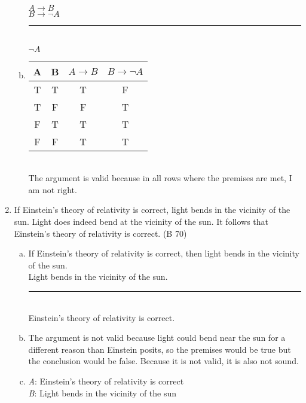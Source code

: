 \documentclass{article}
\begin{document}
\begin{enumerate}
\begin{enumerate}[(a)]
                        $A \to B$\\
                        $B \to \neg A$\\
                        \rule{5em}{.5pt}\\
                        $\neg A$
                  \item
                        \begin{tabular}{c|c|c|c}
                              A                      & B & $A \to B$ & $B \to \neg A$ \\
                              \hline
                              \rowcolor{lightgray} T & T & T         & F              \\
                              \rowcolor{lightgray} T & F & F         & T              \\
                              F                      & T & T         & T              \\
                              F                      & F & T         & T              \\
                        \end{tabular} \\
                        The argument is valid because in all rows where the premises are met, I am not right.\\
            \end{enumerate}
      \item If Einstein's theory of relativity is correct, light bends in the vicinity of the sun. Light does indeed bend at the vicinity of the sun. It follows that Einstein's theory of relativity is correct. (B 70)
            \begin{enumerate}[(a)]
                  \item If Einstein's theory of relativity is correct, then light bends in the vicinity of the sun.\\
                        Light bends in the vicinity of the sun.\\
                        \rule{15em}{.5pt}\\
                        Einstein's theory of relativity is correct.
                  \item The argument is not valid because light could bend near the sun for a different reason than Einstein posits, so the premises would be true but the conclusion would be false. Because it is not valid, it is also not sound.
                  \item \textit{A}: Einstein's theory of relativity is correct\\
                        \textit{B}: Light bends in the vicinity of the sun


\end{enumerate}
\end{enumerate}
\end{document}

